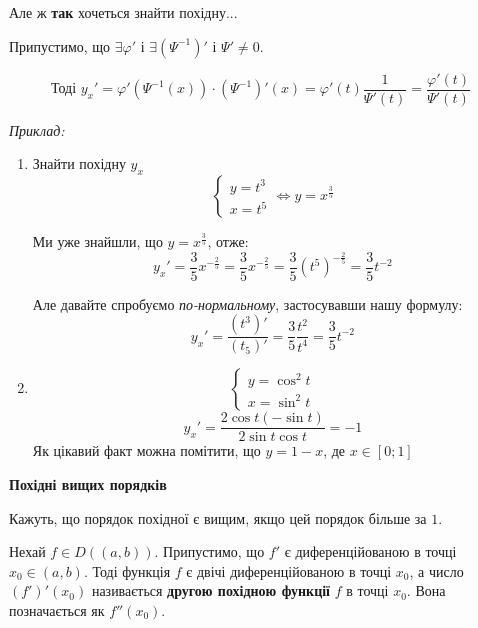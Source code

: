 \documentclass[12pt]{report}
\begin{document}
Але ж \textbf{так} хочеться знайти похідну...

\vspace{3mm}

Припустимо, що $\exists \varphi'$ і $\exists (\Psi^{-1})'$ і $\Psi' \neq 0$.

$$\textrm{Тоді }y_x' = \varphi' ( \Psi^{-1} (x) ) \cdot (\Psi^{-1})' (x) = \varphi'(t) \frac{1}{\Psi'(t)} = \frac{\varphi'(t)}{\Psi'(t)}$$

\textit{Приклад:}

\begin{enumerate}

\item Знайти похідну $y_x$ 
$$\begin{cases} y = t^3 \\ x = t^5\end{cases} \Longleftrightarrow y = x^{\frac{3}{5}}$$

Ми уже знайшли, що $y = x^{\frac{3}{5}}$, отже:
$$y_x' = \frac{3}{5} x^{-\frac{2}{5}} = \frac{3}{5} x^{-\frac{2}{5}} = \frac{3}{5} (t^5)^{-\frac{2}{5}} = \frac{3}{5} t^{-2}$$ 

Але давайте спробуємо \textit{по-нормальному}, застосувавши нашу формулу:
$$y_x' = \frac{(t^3)'}{(t_5)'} = \frac{3}{5} \frac{t^2}{t^4} = \frac{3}{5} t^{-2}$$

\item $$\begin{cases} y = \cos^2 t \\ x = \sin^2 t \end{cases}$$
$$y_x' = \frac{2 \cos t (- \sin t)}{2 \sin t \cos t} = -1$$
Як цікавий факт можна помітити, що $y = 1 - x$, де $x \in [0;1]$


\end{enumerate}


\begin{center}

\textbf{\large{Похідні вищих порядків}}

\end{center}

Кажуть, що порядок похідної є вищим, якщо цей порядок більше за $1$.

Нехай $f \in D((a,b))$. Припустимо, що $f'$ є диференційованою в точці $x_0 \in (a,b)$. Тоді функція $f$ є двічі диференційованою в точці $x_0$, а 
число $(f')'(x_0)$ називається \textbf{другою похідною функції} $f$ в точці $x_0$. Вона позначається як $f''(x_0)$.

\vspace{3mm}
\end{document}
